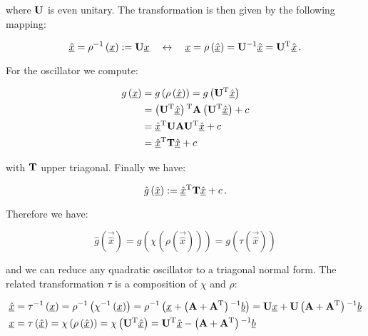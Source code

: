 \documentclass[a4paper,10pt]{article}
\begin{document}
where $\mathbf{U}$ is even unitary. The transformation is then given
by the following mapping:

\begin{equation}
 \underline{\hat{x}} = \rho^{-1}\left(\underline{x}\right) := \mathbf{U} \underline{x}
 \quad \leftrightarrow \quad
 \underline{x} = \rho\left(\underline{\hat{x}}\right) = \mathbf{U}{}^{-1} \underline{\hat{x}} = \mathbf{U}{}^{\textnormal{T}} \underline{\hat{x}} \,.
\end{equation}

For the oscillator we compute:

\begin{equation}
\begin{split}
 g\left(\underline{x}\right) & = g\left(\rho\left(\underline{\hat{x}}\right)\right)
                         = g\left(\mathbf{U}{}^{\textnormal{T}} \underline{\hat{x}}\right) \\
 & = \left(\mathbf{U}{}^{\textnormal{T}} \underline{\hat{x}}\right){}^{\textnormal{T}} \mathbf{A} \left(\mathbf{U}{}^{\textnormal{T}} \underline{\hat{x}}\right)
   + c \\
 & = \underline{\hat{x}}{}^{\textnormal{T}} \mathbf{U} \mathbf{A} \mathbf{U}{}^{\textnormal{T}} \underline{\hat{x}}
   + c \\
 & = \underline{\hat{x}}{}^{\textnormal{T}} \mathbf{T} \underline{\hat{x}}
   + c
\end{split}
\end{equation}

with $\mathbf{T}$ upper triagonal. Finally we have:

\begin{equation}
  \hat{g}\left(\underline{\hat{x}}\right) := \underline{\hat{x}}{}^{\textnormal{T}} \mathbf{T} \underline{\hat{x}} + c \,.
\end{equation}

Therefore we have:

\begin{equation}
  \hat{g}\left(\vec{\hat{x}}\right) = g\left(\chi\left(\rho\left(\vec{\hat{x}}\right)\right)\right)
                                    = g\left(\tau\left(\vec{\hat{x}}\right)\right)
\end{equation}

and we can reduce any quadratic oscillator to a triagonal normal form.
The related transformation $\tau$ is a composition of $\chi$ and $\rho$:

\begin{equation}
\begin{split}
  \underline{\hat{x}} & = \tau{}^{-1} \left(\underline{x}\right)
                  = \rho{}^{-1} \left( \chi{}^{-1} \left(\underline{x}\right) \right)
                  = \rho{}^{-1} \left(\underline{x} + \left(\mathbf{A} + \mathbf{A}{}^{\textnormal{T}}\right){}^{-1} \underline{b}\right)
                  = \mathbf{U} \underline{x} + \mathbf{U} \left(\mathbf{A} + \mathbf{A}{}^{\textnormal{T}}\right){}^{-1} \underline{b} \\
  \underline{x} & = \tau \left(\underline{\hat{x}}\right)
            = \chi \left( \rho \left(\underline{\hat{x}}\right) \right)
            = \chi \left( \mathbf{U}{}^{\textnormal{T}} \underline{\hat{x}} \right)
            = \mathbf{U}{}^{\textnormal{T}} \underline{\hat{x}} - \left(\mathbf{A} + \mathbf{A}{}^{\textnormal{T}}\right){}^{-1} \underline{b}
\end{split}
\end{equation}
\end{document}
